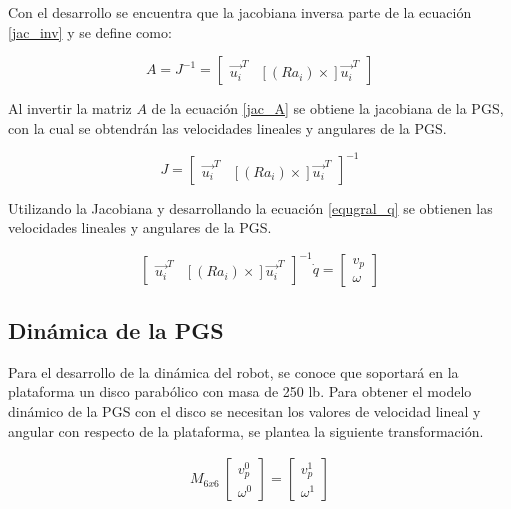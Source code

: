 Con el desarrollo se encuentra que la jacobiana inversa 
parte de la ecuación \ref{jac_inv} y se define como:

\begin{equation}\label{jac_A}
A = J^{-1} = \begin{bmatrix}
\vec{u_i}^T & [(Ra_i)\times]\vec{u_i}^T
\end{bmatrix}
\end{equation}

Al invertir la matriz $A$ de la ecuación \ref{jac_A} se 
obtiene la jacobiana de la PGS, con la cual se obtendrán las 
velocidades lineales y angulares de la PGS.

\begin{equation*}
J = \begin{bmatrix}
\vec{u_i}^T & [(Ra_i)\times]\vec{u_i}^T
\end{bmatrix}^{-1}
\end{equation*}

Utilizando la Jacobiana y desarrollando la ecuación 
\ref{equgral_q} se obtienen las velocidades lineales y 
angulares de la PGS.

\begin{equation*}
\begin{bmatrix}
\vec{u_i}^T & [(Ra_i)\times]\vec{u_i}^T
\end{bmatrix}^{-1} \dot{q} = \begin{bmatrix}
v_p\\
\omega
\end{bmatrix}
\end{equation*}

\subsection{Dinámica de la PGS}

Para el desarrollo de la dinámica del robot, se conoce que 
soportará en la plataforma un disco parabólico con masa de 
250 lb. Para obtener el modelo dinámico de la PGS con el 
disco se necesitan los valores de velocidad lineal y 
angular con respecto de la plataforma, se plantea la 
siguiente transformación.

\begin{equation} \label{equ_tr0-1}
\begin{split}
M_{6x6}\
\begin{bmatrix}
v_p^0\\
\omega^0
\end{bmatrix}  = \begin{bmatrix}
v_p^1\\
\omega^1
\end{bmatrix}
\end{split}
\end{equation}

